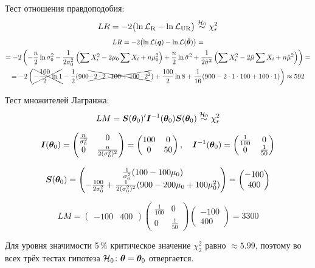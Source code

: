 \begin{problem}
\begin{sol}
\begin{enumerate}
Тест отношения правдоподобия:
\[
LR = -2 \bigl( \ln \mathcal{L}_{\text{R}} - \ln \mathcal{L}_{\text{UR}} \bigr) \mathrel{\stackrel{\mathcal{H}_0}{\sim}} \chi^2_r
\]
\begin{multline*}
LR =  -2 \bigl( \ln \mathcal{L}(\boldsymbol{q}) - \ln \mathcal{L}(\hat{\boldsymbol{\theta}}) \bigr) = \\
 = -2 \left( -\frac{n}{2} \ln \sigma^2_0 - \frac{1}{2\sigma^2_0} \left( \sum X_i^2 - 2\mu_0 \sum X_i + n \mu^2_0\right) + \frac{n}{2} \ln \hat\sigma^2 + \frac{1}{2\hat\sigma^2} \left( \sum X_i^2 - 2\hat\mu \sum X_i + n \hat\mu^2\right) \right) = \\
= -2 \left( \xcancel{- \frac{100}{2} \ln 1} - \frac{1}{2} ( 900 \xcancel{- 2\cdot 2 \cdot 100 + 100\cdot 2^2}) +  \frac{100}{2} \ln 8 + \frac{1}{16} ( 900 - 2\cdot 1 \cdot 100 + 100\cdot 1)  \right) \approx 592
\end{multline*}

Тест множителей Лагранжа:
\[
LM = \boldsymbol{S}(\boldsymbol{\theta}_0)' \boldsymbol{I}^{-1}(\boldsymbol{\theta}_{0}) \boldsymbol{S}(\boldsymbol{\theta}_{0}) \mathrel{\stackrel{\mathcal{H}_0}{\sim}} \chi^2_r
\]

\[
\boldsymbol{I}(\boldsymbol{\theta}_0) = \begin{pmatrix}  \frac{n}{\sigma^2_0} & 0 \\ 0  & \frac{n}{2(\sigma^2_0)^2} \end{pmatrix} = \begin{pmatrix}  100 & 0 \\ 0  & 50 \end{pmatrix}, \quad \boldsymbol{I}^{-1}(\boldsymbol{\theta}_0) = \begin{pmatrix}  \frac{1}{100} & 0 \\ 0  & \frac{1}{50} \end{pmatrix}
\]

\[
\boldsymbol{S}(\boldsymbol{\theta}_0) =  \begin{pmatrix} \frac{1}{\sigma^2_0 } (100-100\mu_0) \\ -\frac{100}{2\sigma^2_0} + \frac{1}{2(\sigma_0^2)^2 } (900 - 200\mu_0 + 100\mu_0^2)  \end{pmatrix} = \begin{pmatrix} -100 \\ 400 \end{pmatrix}
\]

\[
LM =  \begin{pmatrix} -100 & 400 \end{pmatrix}  \begin{pmatrix}  \frac{1}{100} & 0 \\ 0  & \frac{1}{50} \end{pmatrix}  \begin{pmatrix} -100 \\ 400 \end{pmatrix} = 3300
\]

Для уровня значимости 5\,\% критическое значение $\chi^2_2$ равно $\approx 5.99$, поэтому во всех трёх тестах гипотеза $\mathcal{H}_0\colon \boldsymbol{\theta}=\boldsymbol{\theta}_0$ отвергается.

\end{enumerate}
\end{sol}
\end{problem}




